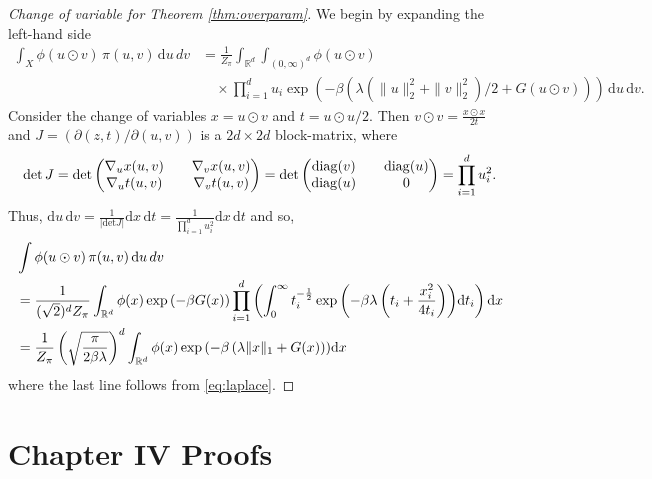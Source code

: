 \documentclass[11pt, twoside]{report}
\begin{document}
\begin{proof}[Change of variable for Theorem \ref{thm:overparam}]
We begin by expanding the left-hand side
    \begin{align*}
    \int_X \phi(u \odot v) \,\pi(u,v)\,\mathrm{d}u\,dv &= \frac{1}{Z_\pi}  \int_{\mathbb{R}^d} \int_{(0,\infty)^d} \phi(u \odot v) \\
    &\quad\times\prod_{i=1}^d u_{i} \exp{ \left(-\beta \left(\lambda (\|u\|_2^2 + \|v\|_2^2)/2 + G(u \odot v) \right) \right)}\, \mathrm{d}u \,\mathrm{d}v.
    \end{align*}
    Consider the change of variables $x = u \odot v$ and $t = u \odot u/2$. Then $v \odot v = \frac{x \odot x}{2t}$ and $J = (\partial(z,t) / \partial(u,v))$ is a $2d \times 2d$ block-matrix, where
    $$\operatorname{det}J 
    = 
    \operatorname{det}\begin{pmatrix}
     \nabla_u x(u,v) && \nabla_v x(u,v) \\
     \nabla_u t(u,v) && \nabla_v t(u,v)
    \end{pmatrix} =\operatorname{det}\begin{pmatrix}
     \operatorname{diag}(v) && \operatorname{diag}(u) \\
     \operatorname{diag}(u) && 0
    \end{pmatrix} = \prod_{i=1}^d u_i^2.$$ 
    Thus, $\mathrm{d}u\,\mathrm{d}v = \frac{1}{|\mathrm{det}J|} \mathrm{d}
    x\,\mathrm{d}t = \frac{1}{\prod_{i=1}^d u_i^2} \mathrm{d}x\,\mathrm{d}t$ and so, 
    \begin{align*}   
    &\int \phi(u\odot v)\, \pi(u,v)\,\mathrm{d}u\,dv \\
       & = \frac{1}{(\sqrt{2})^d Z_\pi} \int_{\mathbb{R}^d} \phi(x) \exp{\left( -\beta G(x) \right)} \prod_{i=1}^d \left( \int_{0}^\infty t_i^{-\frac{1}{2}}\exp{ \left(-\beta \lambda \left(t_i + \frac{x_i^2}{4t_i} \right) \right)} \mathrm{d}t_i \right) \mathrm{d}x\\
       &= \frac{1}{Z_\pi} \left(\sqrt{\frac{\pi}{2\beta \lambda}}\right)^d \int_{\mathbb{R}^d} \phi(x) \exp{\left(-\beta \left(\lambda \|x\|_1 + G(x) \right) \right)}\mathrm{d}x
    \end{align*}
    where the last line follows from \eqref{eq:laplace}.
\end{proof}

\chapter{Chapter IV Proofs}
\label{bilevel_proofs}
\end{document}
